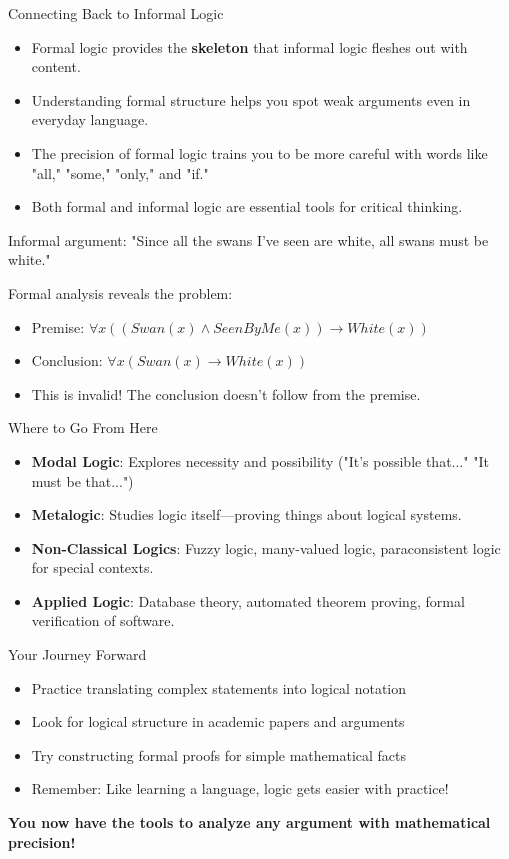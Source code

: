 \documentclass{beamer}
\begin{document}
	\begin{frame}{Connecting Back to Informal Logic}
		\begin{itemize}
			\item Formal logic provides the \textbf{skeleton} that informal logic fleshes out with content.
			\item Understanding formal structure helps you spot weak arguments even in everyday language.
			\item The precision of formal logic trains you to be more careful with words like "all," "some," "only," and "if."
			\item Both formal and informal logic are essential tools for critical thinking.
		\end{itemize}
		
		\begin{example}
			Informal argument: "Since all the swans I've seen are white, all swans must be white."
			
			Formal analysis reveals the problem:
			\begin{itemize}
				\item Premise: $\forall x ((Swan(x) \wedge SeenByMe(x)) \rightarrow White(x))$
				\item Conclusion: $\forall x (Swan(x) \rightarrow White(x))$
				\item This is invalid! The conclusion doesn't follow from the premise.
			\end{itemize}
		\end{example}
	\end{frame}
	
	\begin{frame}{Where to Go From Here}
		\begin{itemize}
			\item \textbf{Modal Logic}: Explores necessity and possibility ("It's possible that..." "It must be that...")
			\item \textbf{Metalogic}: Studies logic itself—proving things about logical systems.
			\item \textbf{Non-Classical Logics}: Fuzzy logic, many-valued logic, paraconsistent logic for special contexts.
			\item \textbf{Applied Logic}: Database theory, automated theorem proving, formal verification of software.
		\end{itemize}
		
		\begin{block}{Your Journey Forward}
			\begin{itemize}
				\item Practice translating complex statements into logical notation
				\item Look for logical structure in academic papers and arguments
				\item Try constructing formal proofs for simple mathematical facts
				\item Remember: Like learning a language, logic gets easier with practice!
			\end{itemize}
			
			\textbf{You now have the tools to analyze any argument with mathematical precision!}
		\end{block}
	\end{frame}
\end{document}
